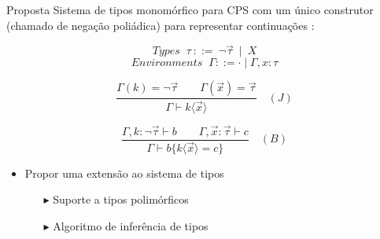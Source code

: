 \begin{frame}{Proposta}
    Sistema de tipos monomórfico para CPS com um único construtor (chamado de negação poliádica) para representar continuações \cite{TORRENS2024}:

    \[
        \textit{Types } \ \tau \ ::= \ \neg \vec{\tau} \ \mid \ X
    \]
    \[
        \textit{Environments } \ \Gamma ::= \cdot \mid \Gamma, x : \tau
    \]

    \[
        \frac{
            \Gamma(k) = \neg \vec{\tau}
            \quad \quad
            \Gamma(\vec{x}) = \vec{\tau}
        }{
            \Gamma \vdash k\langle \vec{x} \rangle
        } \quad (J)
    \]

    \[
        \frac{
            \Gamma, k : \neg \vec{\tau} \vdash b
            \quad \quad
            \Gamma, \vec{x} : \vec{\tau} \vdash c
        }{
            \Gamma \vdash b \{ k \langle \vec{x} \rangle = c \}
        } \quad (B)
    \]

    \begin{itemize}
        \item Propor uma extensão ao sistema de tipos
              \begin{itemize}
                  \item[$\blacktriangleright$] Suporte a tipos polimórficos
                  \item[$\blacktriangleright$] Algoritmo de inferência de tipos
              \end{itemize}
    \end{itemize}
\end{frame}
